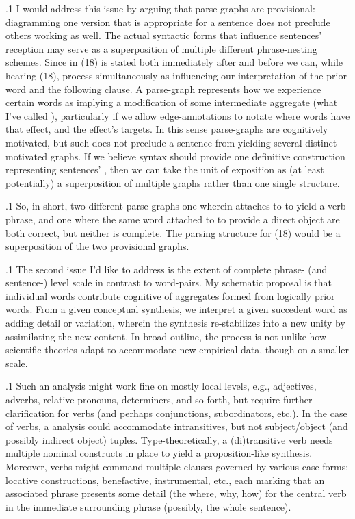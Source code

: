 \documentclass[11pt, twocolumn]{article}
\begin{document}
\p.1{%
I would address this issue by arguing that parse-graphs are provisional:
diagramming one version that is appropriate for a sentence does not
preclude others working as well.  The actual syntactic forms that
influence sentences' reception may serve as a superposition
of multiple different phrase-nesting schemes.  Since 
in \exsRef(18) is stated both immediately after  and before
 we can, while hearing \exsRef(18), process 
simultaneously as influencing our interpretation of the
prior word and the following clause.  A parse-graph represents
how we experience certain words as implying a modification of
some intermediate aggregate (what I've called ),
particularly if we allow edge-annotations to notate where
words have that  effect, and the effect's targets.
In this sense parse-graphs are cognitively motivated,
but such does not preclude a sentence from yielding several
distinct motivated graphs.  If we believe syntax should
provide one definitive construction representing sentences'
, then we can take the unit of exposition
as (at least potentially) a superposition of multiple graphs rather
than one single structure.
} %

\p.1{%
So, in short, two different parse-graphs \mdash{} one wherein  attaches
to  to yield a verb-phrase, and one where the same word
attached to  to provide a direct object \mdash{} are both
correct, but neither is complete.  The  parsing
structure for \exsRef(18) would be a superposition of the two provisional graphs.
} %

\p.1{%
The second issue I'd like to address is the extent of complete phrase-
(and sentence-) level scale in contrast to word-pairs.
My schematic proposal is that individual words contribute
cognitive  of aggregates formed from logically
prior words.  From a given conceptual synthesis, we
interpret a given succedent word as adding detail or
variation, wherein the synthesis re-stabilizes into
a new unity by assimilating the new content.
In broad outline, the process is not unlike
how scientific theories adapt to accommodate new
empirical data, though on a smaller scale.
} %

\p.1{%
Such an analysis might work fine on mostly
local levels, e.g., adjectives, adverbs, relative
pronouns, determiners, and so forth, but require
further clarification for verbs (and perhaps conjunctions,
subordinators, etc.).  In the case of verbs, a
 analysis could accommodate intransitives,
but not subject/object (and possibly indirect object)
tuples.  Type-theoretically, a (di)transitive verb
needs multiple nominal constructs in place to
yield a proposition-like synthesis.  Moreover,
verbs might command multiple clauses governed
by various case-forms: locative constructions,
benefactive, instrumental, etc., each marking
that an associated phrase presents some detail
(the where, why, how) for the central verb
in the immediate surrounding phrase (possibly, the whole sentence).
} %
\end{document}
